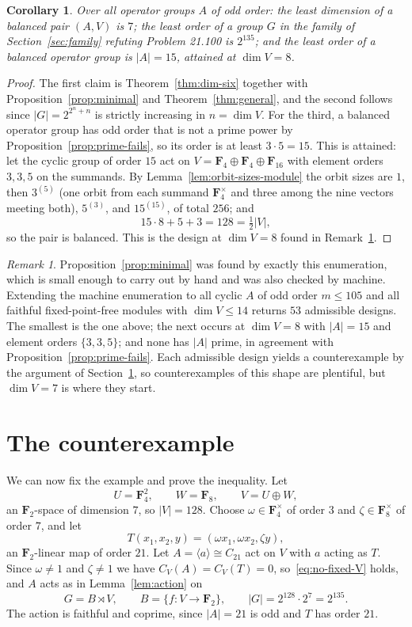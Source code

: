 \documentclass[11pt]{article}
\newtheorem{corollary}[theorem]{Corollary}
\theoremstyle{definition}
\theoremstyle{remark}
\newtheorem{remark}[theorem]{Remark}
\newcommand{\F}{\mathbf F}
\begin{document}
\begin{corollary}\label{cor:minima}
Over all operator groups $A$ of odd order:
the least dimension of a balanced pair $(A,V)$ is $7$; the least order
of a group $G$ in the family of Section~\ref{sec:family} refuting
Problem 21.100 is $2^{135}$; and the least order of a balanced operator
group is $|A|=15$, attained at $\dim V=8$.
\end{corollary}

\begin{proof}
The first claim is Theorem~\ref{thm:dim-six} together with
Proposition~\ref{prop:minimal} and Theorem~\ref{thm:general}, and the
second follows since
$|G|=2^{2^n+n}$ is strictly increasing in $n=\dim V$.  For the third,
a balanced operator group has odd order that is not a prime power by
Proposition~\ref{prop:prime-fails}, so its order is at least
$3\cdot5=15$.  This is attained: let the cyclic group of order
$15$ act on $V=\F_4\oplus\F_4\oplus\F_{16}$ with element orders
$3,3,5$ on the summands.  By Lemma~\ref{lem:orbit-sizes-module} the
orbit sizes are $1$, then $3^{(5)}$ (one orbit from each summand
$\F_4^\times$ and three among the nine vectors meeting both),
$5^{(3)}$, and $15^{(15)}$, of total $256$; and
\[
 15\cdot8+5+3=128=\tfrac12|V| ,
\]
so the pair is balanced.  This is the design at $\dim V=8$ found in
Remark~\ref{rem:search}.
\end{proof}

\begin{remark}\label{rem:search}
Proposition~\ref{prop:minimal} was found by exactly this enumeration,
which is small enough to carry out by hand and was also checked by
machine.  Extending the machine enumeration to all cyclic $A$ of odd
order $m\le105$ and all faithful fixed-point-free modules with
$\dim V\le14$ returns $53$ admissible designs.  The smallest is the one
above; the next occurs at $\dim V=8$ with $|A|=15$ and element orders
$\{3,3,5\}$; and none has $|A|$ prime, in agreement with
Proposition~\ref{prop:prime-fails}.  Each admissible design yields a
counterexample by the argument of Section~\ref{sec:short}, so
counterexamples of this shape are plentiful, but $\dim V=7$ is where
they start.
\end{remark}

\section{The counterexample}\label{sec:short}

We can now fix the example and prove the inequality.  Let
\[
 U=\F_4^2,\qquad W=\F_8,\qquad V=U\oplus W,
\]
an $\F_2$-space of dimension $7$, so $|V|=128$.  Choose
$\omega\in\F_4^\times$ of order $3$ and $\zeta\in\F_8^\times$ of order
$7$, and let
\[
 T(x_1,x_2,y)=(\omega x_1,\omega x_2,\zeta y),
\]
an $\F_2$-linear map of order $21$.  Let $A=\langle a\rangle\cong C_{21}$
act on $V$ with $a$ acting as $T$.  Since $\omega\neq1$ and
$\zeta\neq1$ we have $C_V(A)=C_V(T)=0$, so~\eqref{eq:no-fixed-V} holds,
and $A$ acts as in Lemma~\ref{lem:action} on
\[
 G=B\rtimes V,
 \qquad B=\{f:V\to\F_2\},
 \qquad |G|=2^{128}\cdot2^7=2^{135}.
\]
The action is faithful and coprime, since $|A|=21$ is odd and $T$ has
order $21$.
\end{document}
